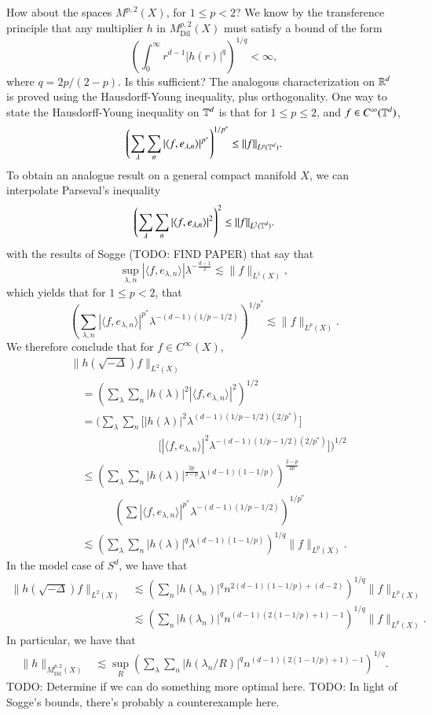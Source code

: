 How about the spaces $M^{p,2}(X)$, for $1 \leq p < 2$? We know by the transference principle that any multiplier $h$ in $M^{p,2}_{\text{Dil}}(X)$ must satisfy a bound of the form
%
\[ \left( \int_0^\infty r^{d-1} |h(r)|^q \right)^{1/q} < \infty, \]
%
where $q = 2p/(2-p)$. Is this sufficient? The analogous characterization on $\operatorname{\mathbb{R}}^d$ is proved using the Hausdorff-Young inequality, plus orthogonality. One way to state the Hausdorff-Young inequality on $\operatorname{\mathbb{T}}^d$ is that for $1 \leq p \leq 2$, and $f \in C^\infty(\operatorname{\mathbb{T}}^d)$,
%
\[ \left( \sum_\lambda \sum_n |\langle f, e_{\lambda,n} \rangle|^{p^*} \right)^{1/p^*} \leq \| f \|_{L^p(\operatorname{\mathbb{T}}^d)}. \]
%
To obtain an analogue result on a general compact manifold $X$, we can interpolate Parseval's inequality
%
\[ \left( \sum_\lambda \sum_n |\langle f, e_{\lambda,n} \rangle|^2 \right)^2 \leq \| f \|_{L^2(\operatorname{\mathbb{T}}^d)}. \]
%
with the results of Sogge (TODO: FIND PAPER) that say that
%
\[ \sup_{\lambda,n} |\langle f, e_{\lambda,n} \rangle| \lambda^{- \frac{d-1}{2}} \lesssim \| f \|_{L^1(X)}, \]
%
which yields that for $1 \leq p < 2$, that
\[ \left( \sum_{\lambda,n} |\langle f, e_{\lambda,n} \rangle|^{p^*} \lambda^{- (d-1)(1/p - 1/2)} \right)^{1/p^*} \lesssim \| f \|_{L^p(X)}. \]
%
We therefore conclude that for $f \in C^\infty(X)$,
%
\begin{align*}
    &\| h(\sqrt{-\Delta}) f \|_{L^2(X)}\\
    &\quad= \left( \sum_\lambda \sum_n |h(\lambda)|^2 |\langle f, e_{\lambda,n} \rangle|^2 \right)^{1/2}\\
    &\quad= \Bigg( \sum_\lambda \sum_n \Big[ |h(\lambda)|^2 \lambda^{(d-1)(1/p - 1/2)(2/p^*)} \Big]\\
    &\quad\quad\quad\quad\quad\quad\quad\quad \Big[ |\langle f, e_{\lambda,n} \rangle|^2 \lambda^{-(d-1)(1/p - 1/2)(2/p^*)} \Big] \Bigg)^{1/2}\\
    &\quad\leq \left( \sum_\lambda \sum_n |h(\lambda)|^{\frac{2p}{2-p}} \lambda^{(d-1)(1 - 1/p)} \right)^{\frac{2-p}{2p}}\\
    &\quad\quad\quad\quad \left( \sum |\langle f, e_{\lambda,n} \rangle|^{p^*} \lambda^{-(d-1)(1/p - 1/2)} \right)^{1/p^*}\\
    &\quad\lesssim \left( \sum_\lambda \sum_n |h(\lambda)|^q \lambda^{(d-1)(1 - 1/p)} \right)^{1/q} \| f \|_{L^p(X)}.
\end{align*}
%
In the model case of $S^d$, we have that
%
\begin{align*}
    \| h(\sqrt{-\Delta}) f \|_{L^2(X)} &\lesssim \left( \sum_n |h(\lambda_n)|^q n^{2(d-1)(1 - 1/p) + (d-2)} \right)^{1/q} \| f \|_{L^p(X)}\\
    &\lesssim \left( \sum_n |h(\lambda_n)|^q n^{(d-1)(2(1 - 1/p) + 1) - 1} \right)^{1/q} \| f \|_{L^p(X)}.
\end{align*}
%
In particular, we have that
%
\begin{align*}
    \| h \|_{M^{p,2}_{\text{Dil}}(X)} &\lesssim \sup_R \left( \sum_\lambda \sum_n |h(\lambda_n/R)|^q n^{(d-1)(2(1 - 1/p) + 1) - 1} \right)^{1/q}.
\end{align*}
%
TODO: Determine if we can do something more optimal here. TODO: In light of Sogge's bounds, there's probably a counterexample here.

